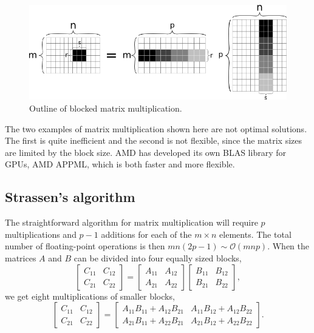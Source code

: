 \begin{figure}
\begin{center}
\includegraphics[scale=0.5]{../08-OpenCL/figs/matmult_loc.png}
\caption{Outline of blocked matrix multiplication.}
\label{fig:OpenCL:matmult_loc}
\end{center}
\end{figure}


The two examples of matrix multiplication shown here are not optimal solutions.
The first is quite inefficient and the second is not flexible, since the matrix sizes are limited by the block size.
AMD has developed its own BLAS library for GPUs, AMD APPML, which is both faster and more flexible.



\subsection{Strassen's algorithm}
The straightforward algorithm for matrix multiplication will require $p$ multiplications and $p-1$ additions for each of the $m\times n$ elements. The total number of floating-point operations is then $mn(2p-1) \sim \mathcal{O}(mnp)$. When the matrices $A$ and $B$ can be divided into four equally sized blocks,
\begin{equation}
\begin{bmatrix}
C_{11} & C_{12} \\
C_{21} & C_{22}
\end{bmatrix}
=
\begin{bmatrix}
A_{11} & A_{12} \\
A_{21} & A_{22} 
\end{bmatrix}
\begin{bmatrix}
B_{11} & B_{12} \\
B_{21} & B_{22}
\end{bmatrix} ,
\end{equation}
we get eight multiplications of smaller blocks,
\begin{equation}
\begin{bmatrix}
C_{11} & C_{12} \\
C_{21} & C_{22}
\end{bmatrix}
=
\begin{bmatrix}
A_{11} B_{11} + A_{12} B_{21} & A_{11} B_{12} + A_{12} B_{22} \\
A_{21} B_{11} + A_{22} B_{21} & A_{21} B_{12} + A_{22} B_{22} 
\end{bmatrix}
.
\end{equation}


